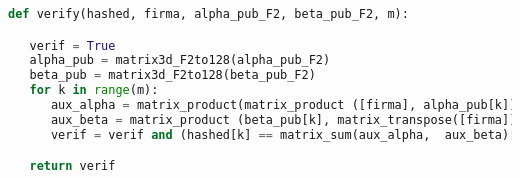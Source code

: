 \vspace{0.25cm}

\begin{lstlisting}[language=Python,caption=Verificación de la firma, label=cod:verif-UOV]
def verify(hashed, firma, alpha_pub_F2, beta_pub_F2, m):

   verif = True
   alpha_pub = matrix3d_F2to128(alpha_pub_F2)
   beta_pub = matrix3d_F2to128(beta_pub_F2)
   for k in range(m):
      aux_alpha = matrix_product(matrix_product ([firma], alpha_pub[k]), matrix_transpose([firma]))
      aux_beta = matrix_product (beta_pub[k], matrix_transpose([firma]))
      verif = verif and (hashed[k] == matrix_sum(aux_alpha,  aux_beta)[0][0])

   return verif
\end{lstlisting}






